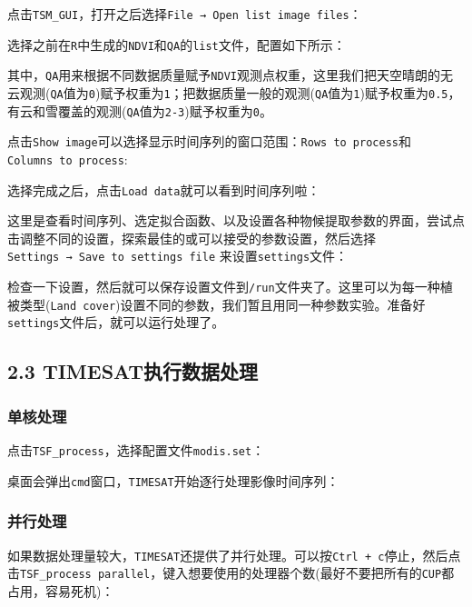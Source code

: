 \documentclass[
]{article}
\begin{document}
点击\texttt{TSM\_GUI}，打开之后选择\texttt{File\ →\ Open\ list\ image\ files}：

选择之前在\texttt{R}中生成的\texttt{NDVI}和\texttt{QA}的\texttt{list}文件，配置如下所示：

其中，\texttt{QA}用来根据不同数据质量赋予\texttt{NDVI}观测点权重，这里我们把天空晴朗的无云观测(\texttt{QA}值为\texttt{0})赋予权重为\texttt{1}；把数据质量一般的观测(\texttt{QA}值为\texttt{1})赋予权重为\texttt{0.5}，有云和雪覆盖的观测(\texttt{QA}值为\texttt{2-3})赋予权重为\texttt{0}。

点击\texttt{Show\ image}可以选择显示时间序列的窗口范围：\texttt{Rows\ to\ process}和\texttt{Columns\ to\ process}:

选择完成之后，点击\texttt{Load\ data}就可以看到时间序列啦：

这里是查看时间序列、选定拟合函数、以及设置各种物候提取参数的界面，尝试点击调整不同的设置，探索最佳的或可以接受的参数设置，然后选择\texttt{Settings\ →\ Save\ to\ settings\ file}
来设置\texttt{settings}文件：

检查一下设置，然后就可以保存设置文件到\texttt{/run}文件夹了。这里可以为每一种植被类型(\texttt{Land\ cover})设置不同的参数，我们暂且用同一种参数实验。准备好\texttt{settings}文件后，就可以运行处理了。

\hypertarget{timesatux6267ux884cux6570ux636eux5904ux7406}{%
\subsection{2.3
TIMESAT执行数据处理}\label{timesatux6267ux884cux6570ux636eux5904ux7406}}

\hypertarget{ux5355ux6838ux5904ux7406}{%
\subsubsection{单核处理}\label{ux5355ux6838ux5904ux7406}}

点击\texttt{TSF\_process}，选择配置文件\texttt{modis.set}：

桌面会弹出\texttt{cmd}窗口，\texttt{TIMESAT}开始逐行处理影像时间序列：

\hypertarget{ux5e76ux884cux5904ux7406}{%
\subsubsection{并行处理}\label{ux5e76ux884cux5904ux7406}}

如果数据处理量较大，\texttt{TIMESAT}还提供了并行处理。可以按\texttt{Ctrl\ +\ c}停止，然后点击\texttt{TSF\_process\ parallel}，键入想要使用的处理器个数(最好不要把所有的\texttt{CUP}都占用，容易死机)：
\end{document}
